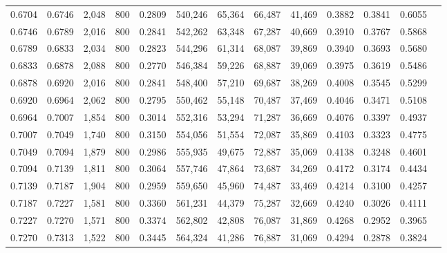 \begin{tabular}{rrrrrrrrrrrrr}
0.6704 & 0.6746 &  2,048 &   800 &                                     0.2809 & 540,246 &  65,364 &  66,487 &  41,469 & 0.3882 & 0.3841 & 0.6055 \\
0.6746 & 0.6789 &  2,016 &   800 &                                     0.2841 & 542,262 &  63,348 &  67,287 &  40,669 & 0.3910 & 0.3767 & 0.5868 \\
0.6789 & 0.6833 &  2,034 &   800 &                                     0.2823 & 544,296 &  61,314 &  68,087 &  39,869 & 0.3940 & 0.3693 & 0.5680 \\
0.6833 & 0.6878 &  2,088 &   800 &                                     0.2770 & 546,384 &  59,226 &  68,887 &  39,069 & 0.3975 & 0.3619 & 0.5486 \\
0.6878 & 0.6920 &  2,016 &   800 &                                     0.2841 & 548,400 &  57,210 &  69,687 &  38,269 & 0.4008 & 0.3545 & 0.5299 \\
0.6920 & 0.6964 &  2,062 &   800 &                                     0.2795 & 550,462 &  55,148 &  70,487 &  37,469 & 0.4046 & 0.3471 & 0.5108 \\
0.6964 & 0.7007 &  1,854 &   800 &                                     0.3014 & 552,316 &  53,294 &  71,287 &  36,669 & 0.4076 & 0.3397 & 0.4937 \\
0.7007 & 0.7049 &  1,740 &   800 &                                     0.3150 & 554,056 &  51,554 &  72,087 &  35,869 & 0.4103 & 0.3323 & 0.4775 \\
0.7049 & 0.7094 &  1,879 &   800 &                                     0.2986 & 555,935 &  49,675 &  72,887 &  35,069 & 0.4138 & 0.3248 & 0.4601 \\
0.7094 & 0.7139 &  1,811 &   800 &                                     0.3064 & 557,746 &  47,864 &  73,687 &  34,269 & 0.4172 & 0.3174 & 0.4434 \\
0.7139 & 0.7187 &  1,904 &   800 &                                     0.2959 & 559,650 &  45,960 &  74,487 &  33,469 & 0.4214 & 0.3100 & 0.4257 \\
0.7187 & 0.7227 &  1,581 &   800 &                                     0.3360 & 561,231 &  44,379 &  75,287 &  32,669 & 0.4240 & 0.3026 & 0.4111 \\
0.7227 & 0.7270 &  1,571 &   800 &                                     0.3374 & 562,802 &  42,808 &  76,087 &  31,869 & 0.4268 & 0.2952 & 0.3965 \\
0.7270 & 0.7313 &  1,522 &   800 &                                     0.3445 & 564,324 &  41,286 &  76,887 &  31,069 & 0.4294 & 0.2878 & 0.3824 \\

\end{tabular}
